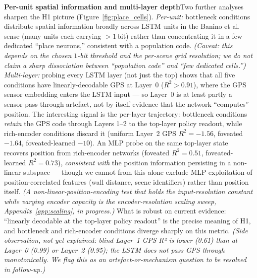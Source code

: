 \documentclass{article}
\begin{document}
\noindent\textbf{Per-unit spatial information and multi-layer depth}\quad Two further analyses sharpen the H1 picture (Figure~\ref{fig:place_cells}). \emph{Per-unit:} bottleneck conditions distribute spatial information broadly across LSTM units in the Banino et al.~\citep{banino2018grid} sense (many units each carrying $>1$\,bit) rather than concentrating it in a few dedicated ``place neurons,'' consistent with a population code. \emph{(Caveat: this depends on the chosen $1$-bit threshold and the per-scene grid resolution; we do not claim a sharp dissociation between ``population code'' and ``few dedicated cells.'')} \emph{Multi-layer:} probing every LSTM layer (not just the top) shows that all five conditions have linearly-decodable GPS at Layer~0 ($R^2 > 0.91$), where the GPS sensor embedding enters the LSTM input --- so Layer~0 is at least partly a sensor-pass-through artefact, not by itself evidence that the network ``computes'' position. The interesting signal is the per-layer trajectory: bottleneck conditions \emph{retain} the GPS code through Layers 1--2 to the top-layer policy readout, while rich-encoder conditions discard it (uniform Layer~2 GPS $R^2 = -1.56$, foveated $-1.64$, foveated-learned $-10$). An MLP probe on the same top-layer state recovers position from rich-encoder networks (foveated $R^2 = 0.51$, foveated-learned $R^2 = 0.73$), \emph{consistent with} the position information persisting in a non-linear subspace --- though we cannot from this alone exclude MLP exploitation of position-correlated features (wall distance, scene identifiers) rather than position itself. \emph{(A non-linear-position-encoding test that holds the input-resolution constant while varying encoder capacity is the encoder-resolution scaling sweep, Appendix~\ref{app:scaling}, in progress.)} What is robust on current evidence: ``linearly decodable at the top-layer policy readout'' is the precise meaning of H1, and bottleneck and rich-encoder conditions diverge sharply on this metric. \emph{(Side observation, not yet explained: blind Layer~1 GPS R² is lower (0.61) than at Layer~0 (0.99) or Layer~2 (0.95); the LSTM does not pass GPS through monotonically. We flag this as an artefact-or-mechanism question to be resolved in follow-up.)}
\end{document}
